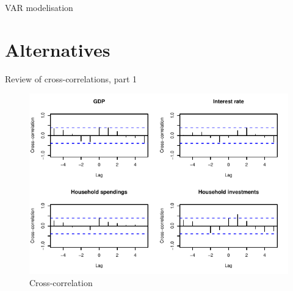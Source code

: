\documentclass[11pt,ignorenonframetext,]{beamer}
\begin{document}
\begin{frame}{VAR modelisation}
\protect\hypertarget{var-modelisation}{}

\FloatBarrier

\tiny

\normalsize

\FloatBarrier

\end{frame}

\hypertarget{alternatives}{%
\section{Alternatives}\label{alternatives}}

\begin{frame}{Review of cross-correlations, part 1}
\protect\hypertarget{review-of-cross-correlations-part-1}{}

\FloatBarrier

\tiny

\begin{figure}[!htbp]

{\centering \includegraphics{presentation_files/figure-beamer/unnamed-chunk-39-1} 

}

\caption{Cross-correlation}\label{fig:unnamed-chunk-39}
\end{figure}

\normalsize

\FloatBarrier

\end{frame}
\end{document}
